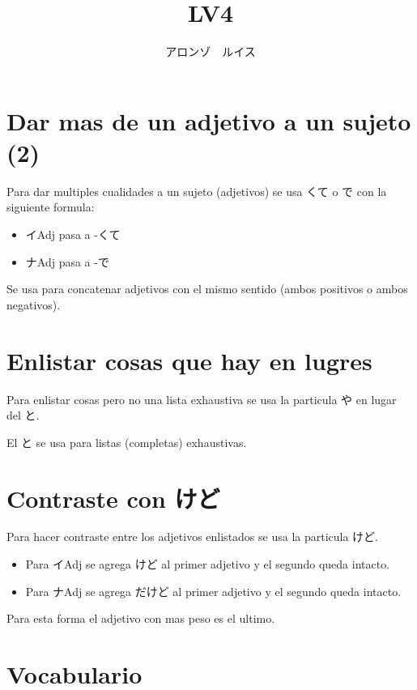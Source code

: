 \documentclass[a4paper,lualatex,ja=standard,base=10pt]{bxjsarticle}
\title{\ruby{第|０５|課}{だい||か} LV4}
\author{アロンゾ　ルイス}
\begin{document}
\setcounter{page}{1}

\maketitle{}
\thispagestyle{fancy}

\section{Dar mas de un adjetivo a un sujeto (2)}

Para dar multiples cualidades a un sujeto (adjetivos) se usa くて o で con la siguiente formula:

\begin{itemize}
  \item イAdj pasa a -くて
  \item ナAdj pasa a -で
\end{itemize}

Se usa para concatenar adjetivos con el mismo sentido (ambos positivos o ambos negativos).

\section{Enlistar cosas que hay en lugres}

Para enlistar cosas pero no una lista exhaustiva se usa la particula や en lugar del と.

El と se usa para listas (completas) exhaustivas.

\section{Contraste con けど}

Para hacer contraste entre los adjetivos enlistados se usa la particula けど.

\begin{itemize}
  \item Para イAdj se agrega けど al primer adjetivo y el segundo queda intacto.
  \item Para ナAdj se agrega だけど al primer adjetivo y el segundo queda intacto.
\end{itemize}

Para esta forma el adjetivo con mas peso es el ultimo.

\section{Vocabulario}
\end{document}
